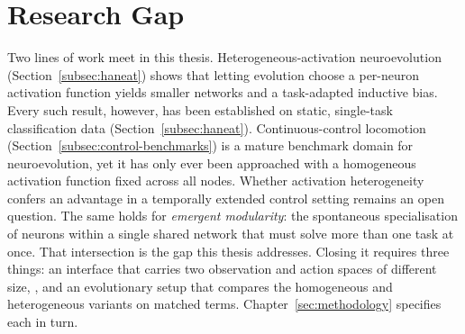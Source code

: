 
\section{Research Gap}
\label{subsec:research-gap-and-contribution}


Two lines of work meet in this thesis.
Heterogeneous-activation neuroevolution (Section~\ref{subsec:haneat}) shows that letting evolution choose a per-neuron activation function yields smaller networks and a task-adapted inductive bias.
Every such result, however, has been established on static, single-task classification data (Section~\ref{subsec:haneat}).
Continuous-control locomotion (Section~\ref{subsec:control-benchmarks}) is a mature benchmark domain for neuroevolution, yet it has only ever been approached with a homogeneous activation function fixed across all nodes.
Whether activation heterogeneity confers an advantage in a temporally extended control setting remains an open question.
The same holds for \emph{emergent modularity}: the spontaneous specialisation of neurons within a single shared network that must solve more than one task at once.
That intersection is the gap this thesis addresses.
Closing it requires three things: an interface that carries two observation and action spaces of different size, , and an evolutionary setup that compares the homogeneous and heterogeneous variants on matched terms.
Chapter~\ref{sec:methodology} specifies each in turn.

